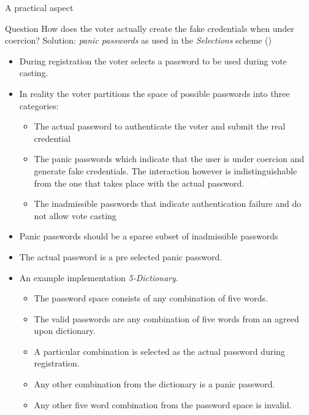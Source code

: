 \documentclass{beamer}
\begin{document}
\begin{frame}[allowframebreaks]{A practical aspect}
\begin{block}{Question}
How does the voter actually create the fake credentials when under coercion?
Solution: \textit{panic passwords} \cite{CPanic} as used in the \textit{Selections} scheme (\cite{CH11})
\end{block}

\begin{itemize}

\item During registration the voter selects a password to be used during vote casting. 
\item In reality the voter partitions the space of possible passwords into three categories:
\begin{itemize}
\item The actual password to authenticate the voter and submit the real credential
\item The panic passwords which indicate that the user is under coercion and generate fake credentials. The interaction however is indistinguishable from the one that takes place with the actual password.
\item The inadmissible passwords that indicate authentication failure and do not allow vote casting
\end{itemize}
\item Panic passwords should be a sparse subset of inadmissible passwords 
\item The actual password is a pre selected panic password. 
\item An example implementation \textit{5-Dictionary}. 
\begin{itemize}
\item The password space consists of any combination of five words. 
\item The valid passwords are any combination of five words from an agreed upon dictionary.
\item A particular combination is selected as the actual password during registration. 
\item Any other combination from the dictionary is a panic password. 
\item Any other five word combination from the password space is invalid.
\end{itemize}

\end{itemize}
\end{frame}
\end{document}
